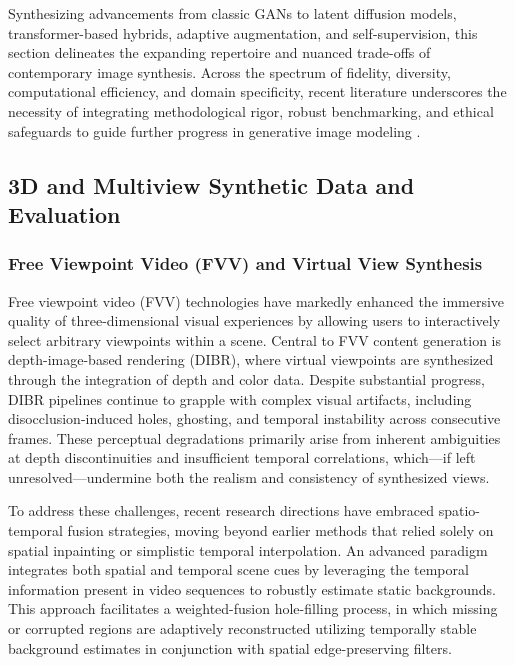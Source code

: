 Synthesizing advancements from classic GANs to latent diffusion models, transformer-based hybrids, adaptive augmentation, and self-supervision, this section delineates the expanding repertoire and nuanced trade-offs of contemporary image synthesis. Across the spectrum of fidelity, diversity, computational efficiency, and domain specificity, recent literature underscores the necessity of integrating methodological rigor, robust benchmarking, and ethical safeguards to guide further progress in generative image modeling \cite{ref1,ref2,ref3,ref5,ref6,ref10,ref12,ref13,ref14,ref15,ref16,ref18,ref21,ref22,ref23,ref24,ref25,ref26,ref29,ref30,ref32,ref54,ref55,ref60,ref61,ref62,ref64,ref65,ref66,ref70,ref73,ref74,ref76,ref79,ref81,ref83,ref85,ref89,ref90,ref91,ref92,ref93,ref94,ref95,ref96,ref97,ref100,ref101,ref102}.

\subsection{3D and Multiview Synthetic Data and Evaluation}

\subsubsection{Free Viewpoint Video (FVV) and Virtual View Synthesis}

Free viewpoint video (FVV) technologies have markedly enhanced the immersive quality of three-dimensional visual experiences by allowing users to interactively select arbitrary viewpoints within a scene. Central to FVV content generation is depth-image-based rendering (DIBR), where virtual viewpoints are synthesized through the integration of depth and color data. Despite substantial progress, DIBR pipelines continue to grapple with complex visual artifacts, including disocclusion-induced holes, ghosting, and temporal instability across consecutive frames. These perceptual degradations primarily arise from inherent ambiguities at depth discontinuities and insufficient temporal correlations, which—if left unresolved—undermine both the realism and consistency of synthesized views.

To address these challenges, recent research directions have embraced spatio-temporal fusion strategies, moving beyond earlier methods that relied solely on spatial inpainting or simplistic temporal interpolation. An advanced paradigm integrates both spatial and temporal scene cues by leveraging the temporal information present in video sequences to robustly estimate static backgrounds. This approach facilitates a weighted-fusion hole-filling process, in which missing or corrupted regions are adaptively reconstructed utilizing temporally stable background estimates in conjunction with spatial edge-preserving filters.

